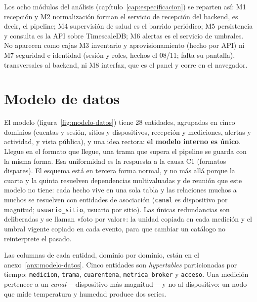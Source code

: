 Los ocho módulos del análisis (capítulo~\ref{cap:especificacion}) se reparten así: M1 recepción y M2
normalización forman el servicio de recepción del backend, es decir, el pipeline; M4 supervisión de
salud es el barrido periódico; M5 persistencia y consulta es la API sobre TimescaleDB; M6 alertas es el
servicio de umbrales. No aparecen como cajas M3 inventario y aprovisionamiento (hecho por API) ni M7 seguridad e
identidad (sesión y roles, hechos el 08/11; falta su pantalla), transversales al backend, ni M8 interfaz, que es el
panel y corre en el navegador.

\section{Modelo de datos}

El modelo (figura~\ref{fig:modelo-datos}) tiene 28 entidades, agrupadas en cinco dominios (cuentas y sesión, sitios y dispositivos, recepción y mediciones, alertas y actividad, y vista pública), y una idea rectora: \textbf{el modelo
interno es único}. Llegue en el formato que llegue, una trama que supera el pipeline se guarda con la misma forma. Esa uniformidad es la respuesta a la causa C1 (formatos
dispares). El esquema está en tercera forma normal, y no más allá porque la cuarta y la quinta resuelven dependencias multivaluadas y de reunión que este modelo no tiene: cada hecho vive en una sola tabla y las
relaciones muchos a muchos se resuelven con entidades de asociación (\texttt{canal} es dispositivo por
magnitud; \texttt{usuario\_sitio}, usuario por sitio). Las únicas redundancias son deliberadas y se
llaman «foto por valor»: la unidad copiada en cada medición y el umbral vigente copiado en cada evento,
para que cambiar un catálogo no reinterprete el pasado.



Las columnas de cada entidad, dominio por dominio, están en el anexo~\ref{anx:modelo-datos}. Cinco entidades son \emph{hypertables} particionadas por tiempo: \texttt{medicion}, \texttt{trama}, \texttt{cuarentena}, \texttt{metrica\_broker} y \texttt{acceso}. Una medición pertenece a un \emph{canal} ---dispositivo más magnitud--- y no al dispositivo: un nodo que mide temperatura y humedad produce dos series.


